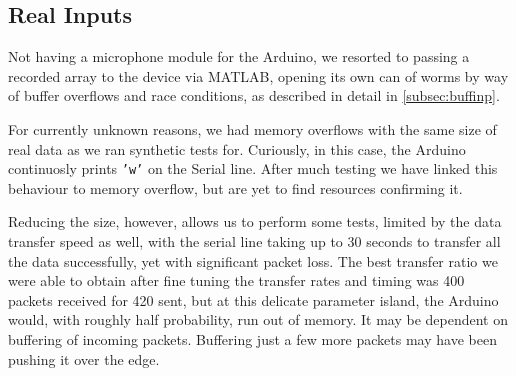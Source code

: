 \subsection{Real Inputs}

Not having a microphone module for the Arduino, we resorted to passing a
recorded array to the device via MATLAB, opening its own can of worms by way of
buffer overflows and race conditions, as described in detail in
\autoref{subsec:buffinp}. 

For currently unknown reasons, we had memory overflows with the same size of
real data as we ran synthetic tests for. Curiously, in this case, the Arduino
continuosly prints \texttt{'w'} on the Serial line. After much testing we have
linked this behaviour to memory overflow, but are yet to find resources
confirming it. 

Reducing the size, however, allows us to perform some tests, limited by the data
transfer speed as well, with the serial line taking up to 30 seconds to transfer
all the data successfully, yet with significant packet loss. The best transfer
ratio we were able to obtain after fine tuning the transfer rates and timing was
400 packets received for 420 sent, but at this delicate parameter island, the
Arduino would, with roughly half probability, run out of memory. It may be
dependent on buffering of incoming packets. Buffering just a few more packets
may have been pushing it over the edge.

